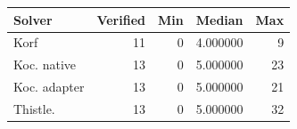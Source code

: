 \begin{tabular}{p{}rrrr}
\hline
Solver & Verified & Min & Median & Max \\
\hline
Korf & 11 & 0 & 4.000000 & 9 \\
Koc. native & 13 & 0 & 5.000000 & 23 \\
Koc. adapter & 13 & 0 & 5.000000 & 21 \\
Thistle. & 13 & 0 & 5.000000 & 32 \\
\hline
\end{tabular}
